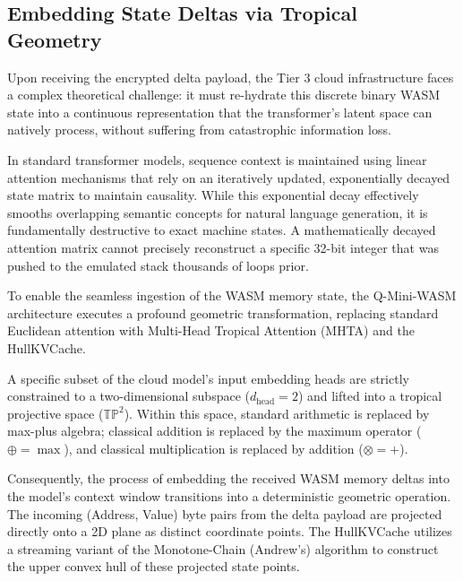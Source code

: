 \documentclass[11pt,a4paper]{article}
\begin{document}
\subsection{Embedding State Deltas via Tropical Geometry}

Upon receiving the encrypted delta payload, the Tier 3 cloud infrastructure faces a complex theoretical challenge: it must re-hydrate this discrete binary WASM state into a continuous representation that the transformer's latent space can natively process, without suffering from catastrophic information loss.

In standard transformer models, sequence context is maintained using linear attention mechanisms that rely on an iteratively updated, exponentially decayed state matrix to maintain causality. While this exponential decay effectively smooths overlapping semantic concepts for natural language generation, it is fundamentally destructive to exact machine states. A mathematically decayed attention matrix cannot precisely reconstruct a specific 32-bit integer that was pushed to the emulated stack thousands of loops prior.

To enable the seamless ingestion of the WASM memory state, the Q-Mini-WASM architecture executes a profound geometric transformation, replacing standard Euclidean attention with Multi-Head Tropical Attention (MHTA) and the HullKVCache.

A specific subset of the cloud model's input embedding heads are strictly constrained to a two-dimensional subspace ($d_{\mathrm{head}} = 2$) and lifted into a tropical projective space ($\mathbb{TP}^2$). Within this space, standard arithmetic is replaced by max-plus algebra; classical addition is replaced by the maximum operator ($\oplus = \max$), and classical multiplication is replaced by addition ($\otimes = +$).

Consequently, the process of embedding the received WASM memory deltas into the model's context window transitions into a deterministic geometric operation. The incoming (Address, Value) byte pairs from the delta payload are projected directly onto a 2D plane as distinct coordinate points. The HullKVCache utilizes a streaming variant of the Monotone-Chain (Andrew's) algorithm to construct the upper convex hull of these projected state points.
\end{document}
